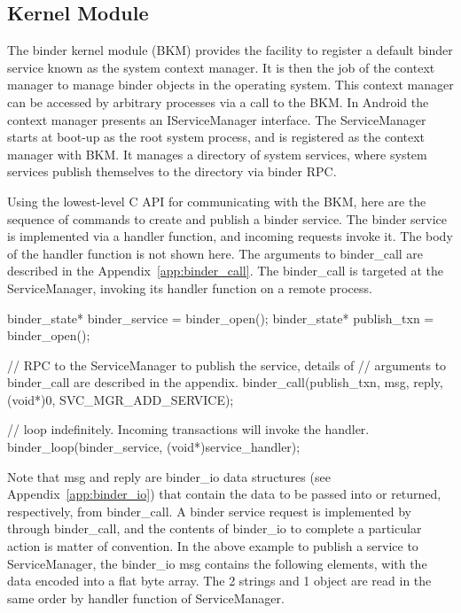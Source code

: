 \documentclass[prodmode]{acmlarge}
\begin{document}
\subsection{Kernel Module}
The binder kernel module (BKM) provides the facility to register a default binder service known as the system context manager. It is then the job of the context manager to manage binder objects in the operating system. This context manager can be accessed by arbitrary processes via a call to the BKM. In Android the context manager presents an IServiceManager interface. The ServiceManager starts at boot-up as the root system process, and is registered as the context manager with BKM. It manages a directory of system services, where system services publish themselves to the directory via binder RPC.

Using the lowest-level C API for communicating with the BKM, here are the sequence of commands to create and publish a binder service. The binder service is implemented via a handler function, and incoming requests invoke it. The body of the handler function is not shown here. The arguments to binder\_call are described in the Appendix~\ref{app:binder_call}. The binder\_call is targeted at the ServiceManager, invoking its handler function on a remote process.

\begin{snippet}[label=snip:binder_call,caption=binder\_call to publish a service with ServiceManager]
binder_state* binder_service = binder_open();
binder_state* publish_txn = binder_open();

// RPC to the ServiceManager to publish the  service, details of
// arguments to binder_call  are described in the appendix.
binder_call(publish_txn, msg, reply, (void*)0, SVC_MGR_ADD_SERVICE);

// loop indefinitely. Incoming transactions  will invoke the handler.
binder_loop(binder_service, (void*)service_handler);
\end{snippet}

Note that msg and reply are binder\_io data structures (see Appendix~\ref{app:binder_io}) that contain the data to be passed into or returned, respectively, from binder\_call. A binder service request is implemented by through binder\_call, and the contents of binder\_io to complete a particular action is matter of convention. In the above example to publish a service to ServiceManager, the binder\_io msg contains the following elements, with the data encoded into a flat byte array. The 2 strings and 1 object are read in the same order by handler function of ServiceManager.
\end{document}
